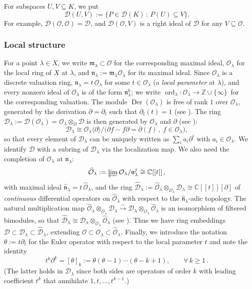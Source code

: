 \documentclass[11pt,reqno]{amsart}
\theoremstyle{plain}
\theoremstyle{definition}
\theoremstyle{remark}
\numberwithin{equation}{section}
\newcommand{\cD}{\mathcal{D}}
\newcommand{\cO}{\mathcal{O}}
\newcommand{\C}{\mathbb{C}}
\newcommand{\Z}{\mathbb{Z}}
\newcommand{\del}{\partial}
\newcommand{\fn}{\mathfrak{n}}
\newcommand{\ml}{\mathfrak{m}_\lambda}
\newcommand{\nl}{\mathfrak{n}_\lambda}
\newcommand{\hO}{\widehat{\cO}}
\newcommand{\hD}{\widehat{\cD}}
\newcommand{\hn}{\widehat{\fn}}
\newcommand{\ff}[2]{[#1]_{#2}}          %
\newcommand{\lan}{\langle}
\newcommand{\ran}{\rangle}
\DeclareMathOperator{\Der}{Der}
\DeclareMathOperator{\ord}{ord}
\begin{document}
For subspaces $U, V \subseteq K$, we put
\begin{equation}
\label{E22}
  \cD(U, V) := \{ P \in \cD(K) \, : \, P(U) \subseteq V \} .
\end{equation}
For example, $\cD(\cO, \cO) = \cD$, and $\cD(\cO, V)$ is a right ideal of $\cD$ for any
$V \subseteq \cO$.

\subsubsection*{Local structure}
For a point $\lambda \in X$, we write $\ml \subset \cO$ for the corresponding maximal ideal,
$\cO_\lambda$ for the local ring of $X$ at $\lambda$, and $\nl := \ml \cO_\lambda$ for its maximal
ideal. Since $\cO_\lambda$ is a discrete valuation ring, $\nl = t\,\cO_\lambda$ for some
$t \in \cO_\lambda$ (a \emph{local parameter} at $\lambda$), and every nonzero ideal of
$\cO_\lambda$ is of the form $\nl^k$; we write $\ord_\lambda: \cO_{\lambda} \to \Z \cup \{\infty\}\,$ for the corresponding valuation. The
module $\Der(\cO_\lambda)$ is free of rank $1$ over $\cO_{\lambda}$, generated by the derivation $\del = \del_t$ such
that $\del_t(t) = 1$ (see \cite[Theorem~II.8.8]{Hartshorne}). The ring
$\cD_\lambda := \cD(\cO_\lambda) = \cO_\lambda \otimes_{\cO} \cD$ is then generated by $\cO_\lambda$ and
$\del$ (see \cite[Corollary~15.5.6]{McConnell}):
\begin{equation}
\label{E23}
  \cD_\lambda \cong \cO_\lambda\lan \del \ran \big/ \bigl(\del f - f \del = \del(f) \, , \
  f \in \cO_\lambda \bigr) ,
\end{equation}
so that every element of $\cD_\lambda$ can be uniquely written as $\sum_i a_i \del^i$ with
$a_i \in \cO_\lambda$. We identify $\cD$ with a subring of $\cD_\lambda$ via the localization map. We also need the completion of $\cO_\lambda$ at $\nl$:
$$
\hO_\lambda := \varprojlim \cO_\lambda/\nl^{j} \cong \C[[t]]\,,
$$ 
with maximal ideal $\hn_\lambda = t\,\hO_\lambda$, and the ring
$\hD_\lambda := \hO_\lambda \otimes_{\cO_\lambda} \cD_\lambda \cong \C[[t]][\del]$ of {\it continuous} differential
operators on $\hO_\lambda$ with respect to the $\hn_\lambda$-adic topology. The natural multiplication map $\hO_\lambda \otimes_{\cO_\lambda} \cD_\lambda \xrightarrow{\sim} \cD_\lambda
\otimes_{\cO_\lambda} \hO_\lambda$ is an isomorphism of filtered bimodules, so that $\hD_\lambda \cong \cD_\lambda \otimes_{\cO_\lambda} \hO_\lambda $ (see
\cite[Lemma~2.3]{knop06}). Thus we have ring embeddings
$\cD \subset \cD_\lambda \subset \hD_\lambda$, extending $\cO \subset \cO_\lambda \subset
\hO_\lambda$. Finally, we introduce the notation $\theta := t \del_t$ for the Euler operator with respect to the local parameter $t$ and note the identity
\begin{equation}
\label{E24}
 t^k \del^k  = \ff{\theta}{k} :=   \theta(\theta - 1) \cdots (\theta - k + 1) , \qquad \forall\,k \ge 1 \,.
\end{equation}
%
(The latter holds in $\cD_\lambda$ since both sides are operators of order $k$ with leading coefficient $t^k$ that annihilate $1, t, \ldots, t^{k-1}$.)
\end{document}
